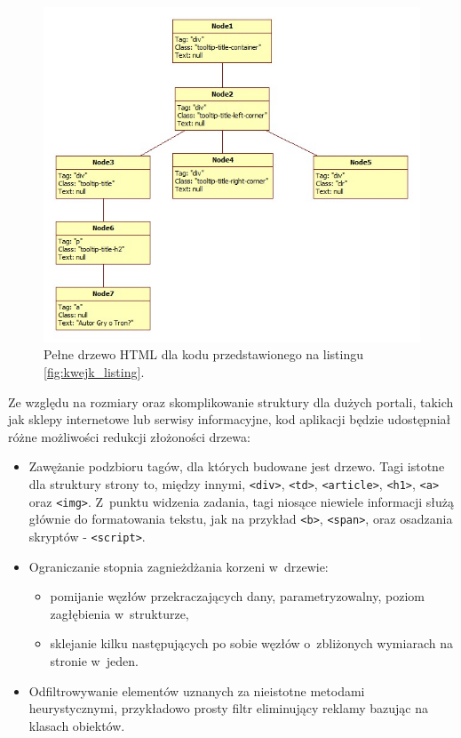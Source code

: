 \documentclass[a4paper,10pt]{article}
\begin{document}
\begin{figure}[h!]
\centering
  \includegraphics[width=\textwidth]{html_tree_full.jpg}
  \caption{Pełne drzewo HTML dla kodu przedstawionego na listingu \ref{fig:kwejk_listing}.}
  \label{fig:html_tree_full}
\end{figure}

Ze względu na rozmiary oraz skomplikowanie struktury dla dużych portali, takich jak sklepy internetowe lub serwisy informacyjne, kod aplikacji będzie udostępniał różne możliwości redukcji złożoności drzewa:

\begin{itemize}
 \item Zawężanie podzbioru tagów, dla których budowane jest drzewo. Tagi istotne dla struktury strony to, między innymi, \verb+<div>+, \verb+<td>+, \verb+<article>+, \verb+<h1>+, \verb+<a>+ oraz \verb+<img>+. Z~punktu widzenia zadania, tagi niosące niewiele informacji służą głównie do formatowania tekstu, jak na przykład \verb+<b>+, \verb+<span>+, oraz osadzania skryptów - \verb+<script>+.
 \item Ograniczanie stopnia zagnieżdżania korzeni w~drzewie:
    \begin{itemize}
	\item pomijanie węzłów przekraczających dany, parametryzowalny, poziom zagłębienia w~strukturze,
	\item sklejanie kilku następujących po sobie węzłów o~zbliżonych wymiarach na stronie w~jeden.
    \end{itemize}
 \item Odfiltrowywanie elementów uznanych za nieistotne metodami heurystycznymi, przykładowo prosty filtr eliminujący reklamy bazując na klasach obiektów.
\end{itemize}
\end{document}
